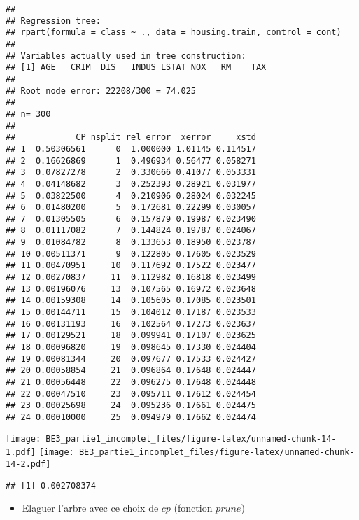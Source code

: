 \documentclass[
]{article}
\newenvironment{Shaded}{\begin{snugshade}}{\end{snugshade}}
\newcommand{\CommentTok}[1]{\textcolor[rgb]{0.56,0.35,0.01}{\textit{#1}}}
\newcommand{\DecValTok}[1]{\textcolor[rgb]{0.00,0.00,0.81}{#1}}
\newcommand{\NormalTok}[1]{#1}
\newcommand{\SpecialCharTok}[1]{\textcolor[rgb]{0.00,0.00,0.00}{#1}}
\providecommand{\tightlist}{%
  \setlength{\itemsep}{0pt}\setlength{\parskip}{0pt}}
\begin{document}
\begin{verbatim}
## 
## Regression tree:
## rpart(formula = class ~ ., data = housing.train, control = cont)
## 
## Variables actually used in tree construction:
## [1] AGE   CRIM  DIS   INDUS LSTAT NOX   RM    TAX  
## 
## Root node error: 22208/300 = 74.025
## 
## n= 300 
## 
##            CP nsplit rel error  xerror     xstd
## 1  0.50306561      0  1.000000 1.01145 0.114517
## 2  0.16626869      1  0.496934 0.56477 0.058271
## 3  0.07827278      2  0.330666 0.41077 0.053331
## 4  0.04148682      3  0.252393 0.28921 0.031977
## 5  0.03822500      4  0.210906 0.28024 0.032245
## 6  0.01480200      5  0.172681 0.22299 0.030057
## 7  0.01305505      6  0.157879 0.19987 0.023490
## 8  0.01117082      7  0.144824 0.19787 0.024067
## 9  0.01084782      8  0.133653 0.18950 0.023787
## 10 0.00511371      9  0.122805 0.17605 0.023529
## 11 0.00470951     10  0.117692 0.17522 0.023477
## 12 0.00270837     11  0.112982 0.16818 0.023499
## 13 0.00196076     13  0.107565 0.16972 0.023648
## 14 0.00159308     14  0.105605 0.17085 0.023501
## 15 0.00144711     15  0.104012 0.17187 0.023533
## 16 0.00131193     16  0.102564 0.17273 0.023637
## 17 0.00129521     18  0.099941 0.17107 0.023625
## 18 0.00096820     19  0.098645 0.17330 0.024404
## 19 0.00081344     20  0.097677 0.17533 0.024427
## 20 0.00058854     21  0.096864 0.17648 0.024447
## 21 0.00056448     22  0.096275 0.17648 0.024448
## 22 0.00047510     23  0.095711 0.17612 0.024454
## 23 0.00025698     24  0.095236 0.17661 0.024475
## 24 0.00010000     25  0.094979 0.17662 0.024474
\end{verbatim}

\texttt{[image: BE3\_partie1\_incomplet\_files/figure-latex/unnamed-chunk-14-1.pdf]}
\texttt{[image: BE3\_partie1\_incomplet\_files/figure-latex/unnamed-chunk-14-2.pdf]}

\begin{Shaded}
\end{Shaded}

\begin{verbatim}
## [1] 0.002708374
\end{verbatim}

\begin{itemize}
\tightlist
\item
  Elaguer l'arbre avec ce choix de \(\textit{cp}\) (fonction
  \(\textit{prune}\))
\end{itemize}
\end{document}

